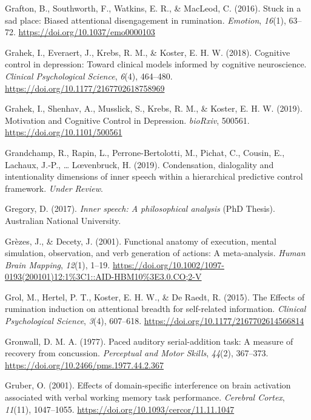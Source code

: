 \documentclass[a4paper,12pt,twoside,onecolumn,openright,final,oldfontcommands]{memoir}
\begin{document}
\leavevmode\hypertarget{ref-grafton_stuck_2016}{}%
Grafton, B., Southworth, F., Watkins, E. R., \& MacLeod, C. (2016). Stuck in a sad place: Biased attentional disengagement in rumination. \emph{Emotion}, \emph{16}(1), 63--72. \url{https://doi.org/10.1037/emo0000103}

\leavevmode\hypertarget{ref-grahek_cognitive_2018}{}%
Grahek, I., Everaert, J., Krebs, R. M., \& Koster, E. H. W. (2018). Cognitive control in depression: Toward clinical models informed by cognitive neuroscience. \emph{Clinical Psychological Science}, \emph{6}(4), 464--480. \url{https://doi.org/10.1177/2167702618758969}

\leavevmode\hypertarget{ref-grahek_motivation_2019}{}%
Grahek, I., Shenhav, A., Musslick, S., Krebs, R. M., \& Koster, E. H. W. (2019). Motivation and Cognitive Control in Depression. \emph{bioRxiv}, 500561. \url{https://doi.org/10.1101/500561}

\leavevmode\hypertarget{ref-grandchamp_condensation_2019}{}%
Grandchamp, R., Rapin, L., Perrone-Bertolotti, M., Pichat, C., Cousin, E., Lachaux, J.-P., \ldots{} Lœvenbruck, H. (2019). Condensation, dialogality and intentionality dimensions of inner speech within a hierarchical predictive control framework. \emph{Under Review}.

\leavevmode\hypertarget{ref-gregory_inner_2017}{}%
Gregory, D. (2017). \emph{Inner speech: A philosophical analysis} (PhD Thesis). Australian National University.

\leavevmode\hypertarget{ref-grezes_functional_2001}{}%
Grèzes, J., \& Decety, J. (2001). Functional anatomy of execution, mental simulation, observation, and verb generation of actions: A meta-analysis. \emph{Human Brain Mapping}, \emph{12}(1), 1--19. \url{https://doi.org/10.1002/1097-0193(200101)12:1\%3C1::AID-HBM10\%3E3.0.CO;2-V}

\leavevmode\hypertarget{ref-grol_effects_2015}{}%
Grol, M., Hertel, P. T., Koster, E. H. W., \& De Raedt, R. (2015). The Effects of rumination induction on attentional breadth for self-related information. \emph{Clinical Psychological Science}, \emph{3}(4), 607--618. \url{https://doi.org/10.1177/2167702614566814}

\leavevmode\hypertarget{ref-gronwall_paced_1977}{}%
Gronwall, D. M. A. (1977). Paced auditory serial-addition task: A measure of recovery from concussion. \emph{Perceptual and Motor Skills}, \emph{44}(2), 367--373. \url{https://doi.org/10.2466/pms.1977.44.2.367}

\leavevmode\hypertarget{ref-gruber_effects_2001}{}%
Gruber, O. (2001). Effects of domain-specific interference on brain activation associated with verbal working memory task performance. \emph{Cerebral Cortex}, \emph{11}(11), 1047--1055. \url{https://doi.org/10.1093/cercor/11.11.1047}
\end{document}
